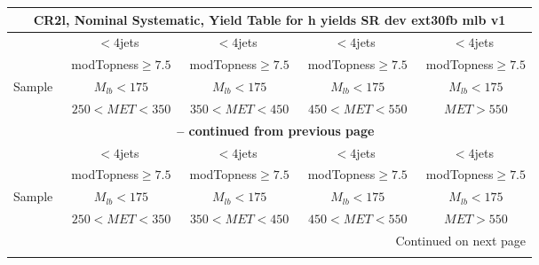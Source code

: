 \documentclass{article}
\begin{document}
 
 
 
 
\pagebreak 

 
 
 
 
\begin{longtable}{|l|c|c|c|c|} 
 
\multicolumn{5}{c}{ CR2l, Nominal Systematic, Yield Table for h yields SR dev ext30fb mlb v1 }\\* \hline 
  & $<4$jets  & $<4$jets  & $<4$jets  & $<4$jets \\* 
  & ~modTopness$\ge7.5$  & ~modTopness$\ge7.5$  & ~modTopness$\ge7.5$  & ~modTopness$\ge7.5$ \\* 
Sample  & ~$M_{lb}<175$  & ~$M_{lb}<175$  & ~$M_{lb}<175$  & ~$M_{lb}<175$ \\* 
  & ~$250<MET<350$  & ~$350<MET<450$  & ~$450<MET<550$  & ~$MET>550$ \\* 
\hline \hline 
\endfirsthead 
 
\multicolumn{5}{c}{{\bfseries \tablename\ \thetable{} -- continued from previous page}}\\* \hline 
  & $<4$jets  & $<4$jets  & $<4$jets  & $<4$jets \\* 
  & ~modTopness$\ge7.5$  & ~modTopness$\ge7.5$  & ~modTopness$\ge7.5$  & ~modTopness$\ge7.5$ \\* 
Sample  & ~$M_{lb}<175$  & ~$M_{lb}<175$  & ~$M_{lb}<175$  & ~$M_{lb}<175$ \\* 
  & ~$250<MET<350$  & ~$350<MET<450$  & ~$450<MET<550$  & ~$MET>550$ \\* 
\hline \hline 
\endhead 
 
\multicolumn{5}{|r|}{{Continued on next page}}\\* \hline 
\endfoot 
 
 
\endlastfoot 
 

\end{longtable}
\end{document}
